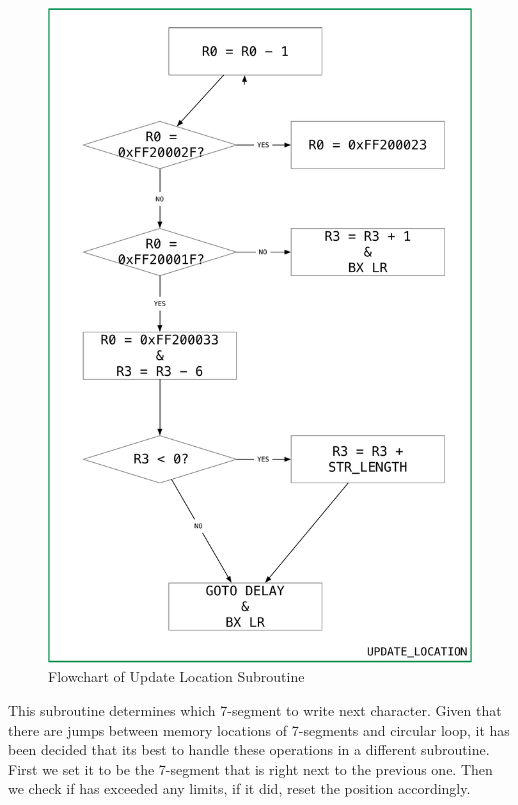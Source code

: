 \documentclass[titlepage]{article}
\begin{document}
	\begin{figure}
		\vspace*{-4em}
		\centering
		\includegraphics[scale=.25]{../images/update_location.pdf}
		\caption{Flowchart of Update Location Subroutine}
	\end{figure}
	This subroutine determines which 7-segment to write next character. Given that there are jumps between memory locations of 7-segments and circular loop, it has been decided that its best to handle these operations in a different subroutine. First we set it to be the 7-segment that is right next to the previous one. Then we check if has exceeded any limits, if it did, reset the position accordingly.
\end{document}
